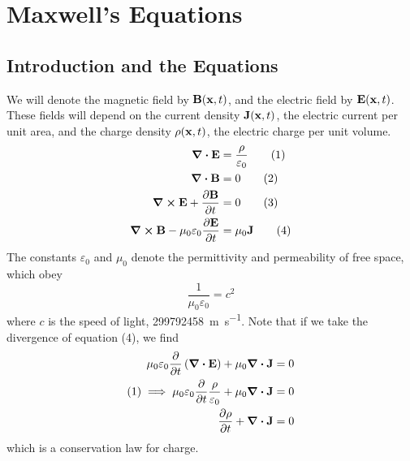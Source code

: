\documentclass{article}
\begin{document}
\section{Maxwell's Equations}
\subsection{Introduction and the Equations}
We will denote the magnetic field by $\vb B(\vb x, t)$, and the electric field by $\vb E(\vb x, t)$. These fields will depend on the current density $\vb J(\vb x, t)$, the electric current per unit area, and the charge density $\rho(\vb x, t)$, the electric charge per unit volume.
\begin{align}
    \div{\vb E}                                      & = \frac{\rho}{\varepsilon_0} \tag{1} \\
    \div{\vb B}                                      & = 0                          \tag{2} \\
    \curl{\vb E} + \pdv{\vb B}{t}                    & = 0                          \tag{3} \\
    \curl{\vb B} - \mu_0\varepsilon_0 \pdv{\vb E}{t} & = \mu_0 \vb J \tag{4}
\end{align}
The constants $\varepsilon_0$ and $\mu_0$ denote the permittivity and permeability of free space, which obey
\[ \frac{1}{\mu_0 \varepsilon_0} = c^2 \]
where $c$ is the speed of light, \SI{299792458}{\metre\per\second}. Note that if we take the divergence of equation (4), we find
\begin{align*}
    \mu_0 \varepsilon_0 \pdv{t}\left( \div{\vb E} \right) + \mu_0 \div{\vb J}              & = 0 \\
    (1) \implies \mu_0 \varepsilon_0 \pdv{t}\frac{\rho}{\varepsilon_0} + \mu_0 \div{\vb J} & = 0 \\
    \pdv{\rho}{t} + \div{\vb J}                                                            & = 0 \\
\end{align*}
which is a conservation law for charge.
\end{document}
